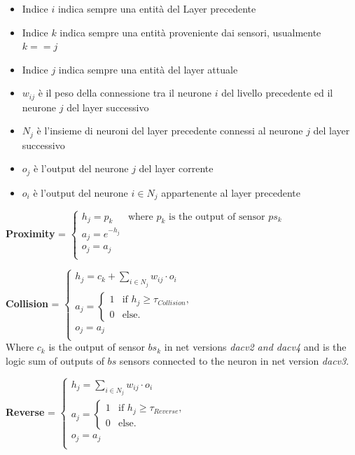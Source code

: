 \begin{itemize}
    \item Indice ${i}$ indica sempre una entità del Layer precedente
    \item Indice ${k}$ indica sempre una entità proveniente dai sensori, usualmente $k==j$
    \item Indice ${j}$ indica sempre una entità del layer attuale
    \item $w_{ij}$ è il peso della connessione tra il neurone $i$ del livello precedente ed il neurone $j$ del layer successivo
    \item $N_j$ è l'insieme di neuroni del layer precedente connessi al neurone $j$ del layer successivo
    \item $o_j$ è l'output del neurone $j$ del layer corrente
    \item $o_i$ è l'output del neurone $i \in N_j$ appartenente al layer precedente
\end{itemize}

\newpage

\textbf{Proximity} = $
    \begin{cases}
        h_j=p_k & \text{where $p_k$ is the output of sensor $ps_k$} \\
        a_j=e^{-h_j} & \\
        o_j=a_j & \\
    \end{cases}
$\\

\hfill\break

\textbf{Collision} = $
    \begin{cases}
        h_j = c_k + \sum_{i\in N_j} w_{ij}\cdot o_i \\
        a_j = \begin{cases}
           1 & \text{if $h_j \ge \tau_{Collision}$,}\\
           0 & \text{else.}
        \end{cases} & \\
        o_j = a_j & \\
    \end{cases}
$\\

\hfill\break
Where $c_k$ is the output of sensor $bs_k$ in net versions \textit{dacv2 and dacv4} and is the logic sum of outputs of $bs$ sensors connected to the neuron in net version \textit{dacv3}. 

\hfill\break

\textbf{Reverse} = $
    \begin{cases}
        h_j = \sum_{i\in N_j} w_{ij}\cdot o_i & \\
        a_j = \begin{cases}
           1 & \text{if $h_j \ge \tau_{Reverse}$,}\\
           0 & \text{else.}
        \end{cases} & \\
        o_j = a_j & \\
    \end{cases}
$\\

